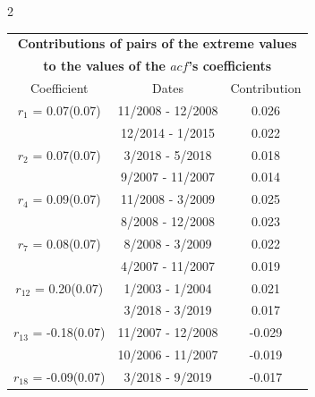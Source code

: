 
\thispagestyle{empty}
\begin{multicols}{2}{ 
\begin{tabular}{ccc}
\multicolumn{3}{c}{\textbf{Contributions of pairs of the extreme values} }  \vspace{-.10in}  \\ 
\multicolumn{3}{c}{ \textbf{to the values of the $acf$'s coefficients}} \\ 
\hline 
\hline                  Coefficient  &  Dates &  Contribution \\ 
\hline 
  $r_{ 1}$ = 0.07(0.07) &      11/2008 - 12/2008 &        0.026   \vspace{-.10in} \\  
&       12/2014 -  1/2015 &        0.022  \vspace{-.02in} \\ \hline 
  $r_{ 2}$ = 0.07(0.07) &       3/2018 -  5/2018 &        0.018   \vspace{-.10in} \\  
&        9/2007 - 11/2007 &        0.014  \vspace{-.02in} \\ \hline 
  $r_{ 4}$ = 0.09(0.07) &      11/2008 -  3/2009 &        0.025   \vspace{-.10in} \\  
&        8/2008 - 12/2008 &        0.023  \vspace{-.02in} \\ \hline 
  $r_{ 7}$ = 0.08(0.07) &       8/2008 -  3/2009 &        0.022   \vspace{-.10in} \\  
&        4/2007 - 11/2007 &        0.019  \vspace{-.02in} \\ \hline 
  $r_{12}$ = 0.20(0.07) &       1/2003 -  1/2004 &        0.021   \vspace{-.10in} \\  
&        3/2018 -  3/2019 &        0.017  \vspace{-.02in} \\ \hline 
  $r_{13}$ = -0.18(0.07) &      11/2007 - 12/2008 &       -0.029    \vspace{-.10in} \\ 
  &       10/2006 - 11/2007 &       -0.019  \vspace{-.02in}   \\ \hline 
    $r_{18}$ = -0.09(0.07) &       3/2018 -  9/2019 &       -0.017    \vspace{-.10in} \\ 

\end{tabular}}
\end{multicols}
